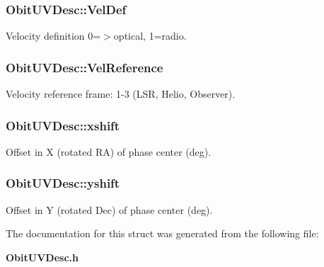 \subsubsection{ {\bf Obit\-UVDesc::Vel\-Def}}\label{structObitUVDesc_o49}


Velocity definition 0=$>$optical, 1=radio. 

\subsubsection{ {\bf Obit\-UVDesc::Vel\-Reference}}\label{structObitUVDesc_o48}


Velocity reference frame: 1-3 (LSR, Helio, Observer). 

\subsubsection{ {\bf Obit\-UVDesc::xshift}}\label{structObitUVDesc_o20}


Offset in X (rotated RA) of phase center (deg). 

\subsubsection{ {\bf Obit\-UVDesc::yshift}}\label{structObitUVDesc_o21}


Offset in Y (rotated Dec) of phase center (deg). 



The documentation for this struct was generated from the following file:\begin{CompactItemize}
\item 
{\bf Obit\-UVDesc.h}\end{CompactItemize}
